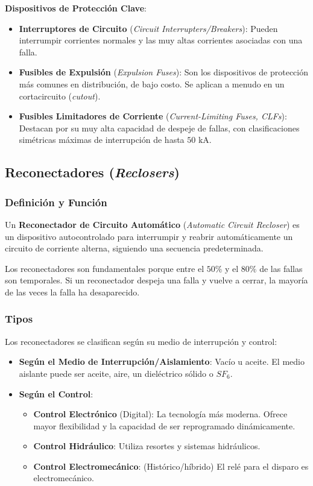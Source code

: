 \textbf{Dispositivos de Protección Clave}:
\begin{itemize}
    \item \textbf{Interruptores de Circuito} (\textit{Circuit Interrupters/Breakers}): Pueden interrumpir corrientes normales y las muy altas corrientes asociadas con una falla.
    \item \textbf{Fusibles de Expulsión} (\textit{Expulsion Fuses}): Son los dispositivos de protección más comunes en distribución, de bajo costo. Se aplican a menudo en un cortacircuito (\textit{cutout}).
    \item \textbf{Fusibles Limitadores de Corriente} (\textit{Current-Limiting Fuses, CLFs}): Destacan por su muy alta capacidad de despeje de fallas, con clasificaciones simétricas máximas de interrupción de hasta $50 \text{ kA}$.
\end{itemize}

\subsection*{Reconectadores (\textit{Reclosers})}

\subsubsection*{Definición y Función}
Un \textbf{Reconectador de Circuito Automático} (\textit{Automatic Circuit Recloser}) es un dispositivo autocontrolado para interrumpir y reabrir automáticamente un circuito de corriente alterna, siguiendo una secuencia predeterminada.

Los reconectadores son fundamentales porque entre el $50\%$ y el $80\%$ de las fallas son temporales. Si un reconectador despeja una falla y vuelve a cerrar, la mayoría de las veces la falla ha desaparecido.

\subsubsection*{Tipos}
Los reconectadores se clasifican según su medio de interrupción y control:
\begin{itemize}
    \item \textbf{Según el Medio de Interrupción/Aislamiento}: Vacío u aceite. El medio aislante puede ser aceite, aire, un dieléctrico sólido o $SF_6$.
    \item \textbf{Según el Control}:
    \begin{itemize}
        \item \textbf{Control Electrónico} (Digital): La tecnología más moderna. Ofrece mayor flexibilidad y la capacidad de ser reprogramado dinámicamente.
        \item \textbf{Control Hidráulico}: Utiliza resortes y sistemas hidráulicos.
        \item \textbf{Control Electromecánico}: (Histórico/híbrido) El relé para el disparo es electromecánico.
    \end{itemize}
\end{itemize}


